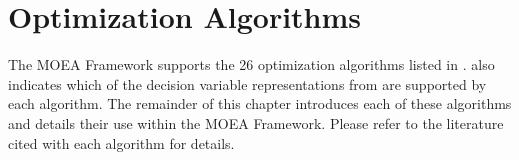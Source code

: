 %
%

\chapter{Optimization Algorithms}
\label{chpt:algorithms}

The MOEA Framework supports the 26 optimization algorithms listed in .   also indicates which of the decision variable representations from  are supported by each algorithm.  The remainder of this chapter introduces each of these algorithms and details their use within the MOEA Framework.  Please refer to the literature cited with each algorithm for details.

